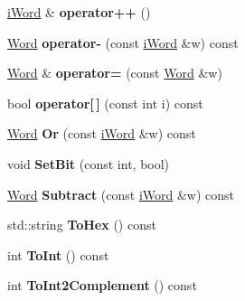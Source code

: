 \begin{DoxyCompactItemize}
\item 
\hypertarget{classWord_a3837f49bcb44597e6d738ccb0eeed144}{
\hyperlink{classiWord}{iWord} \& {\bfseries operator++} ()}
\label{classWord_a3837f49bcb44597e6d738ccb0eeed144}

\item 
\hypertarget{classWord_af930dcccdcf2cdbb90df31ac61a4933c}{
\hyperlink{classWord}{Word} {\bfseries operator-\/} (const \hyperlink{classiWord}{iWord} \&w) const }
\label{classWord_af930dcccdcf2cdbb90df31ac61a4933c}

\item 
\hypertarget{classWord_a437535c5c19c0ecfc01d52e2c297fe2c}{
\hyperlink{classWord}{Word} \& {\bfseries operator=} (const \hyperlink{classWord}{Word} \&w)}
\label{classWord_a437535c5c19c0ecfc01d52e2c297fe2c}

\item 
\hypertarget{classWord_a0b08a81ced05b38d3d719ef70ecb3215}{
bool {\bfseries operator\mbox{[}$\,$\mbox{]}} (const int i) const }
\label{classWord_a0b08a81ced05b38d3d719ef70ecb3215}

\item 
\hypertarget{classWord_a681da292897265ae47f144a99d49d9ec}{
\hyperlink{classWord}{Word} {\bfseries Or} (const \hyperlink{classiWord}{iWord} \&w) const }
\label{classWord_a681da292897265ae47f144a99d49d9ec}

\item 
\hypertarget{classWord_a8449f26fb840ca22dcc2ba3fc816d068}{
void {\bfseries SetBit} (const int, bool)}
\label{classWord_a8449f26fb840ca22dcc2ba3fc816d068}

\item 
\hypertarget{classWord_aef1af160cdcc631473aec52ea883e2e5}{
\hyperlink{classWord}{Word} {\bfseries Subtract} (const \hyperlink{classiWord}{iWord} \&w) const }
\label{classWord_aef1af160cdcc631473aec52ea883e2e5}

\item 
\hypertarget{classWord_af71af6fa290db8e9b4719c2b95ba9af0}{
std::string {\bfseries ToHex} () const }
\label{classWord_af71af6fa290db8e9b4719c2b95ba9af0}

\item 
\hypertarget{classWord_acf9a6c3d9cf07d66da592ec76f572464}{
int {\bfseries ToInt} () const }
\label{classWord_acf9a6c3d9cf07d66da592ec76f572464}

\item 
\hypertarget{classWord_a4116e08d36472a287c06a4aa14e7ed4f}{
int {\bfseries ToInt2Complement} () const }
\label{classWord_a4116e08d36472a287c06a4aa14e7ed4f}


\end{DoxyCompactItemize}
